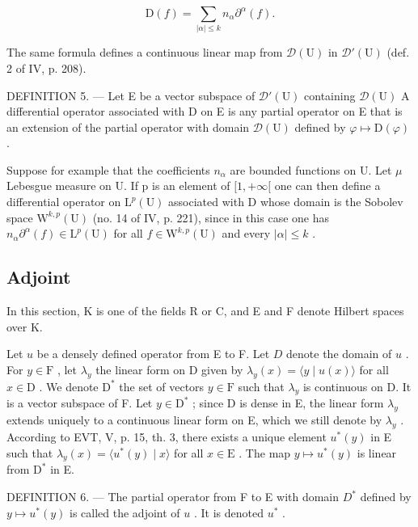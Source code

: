 \[
\mathrm{D} (f) = \sum_ {| \alpha | \leqslant k} n _ {\alpha} \partial^ {\alpha} (f).
\]

The same formula defines a continuous linear map from \(\mathcal{D}(\mathrm{U})\) in \(\mathcal{D}'(\mathrm{U})\) (def. 2 of IV, p. 208).

DEFINITION 5. --- Let E be a vector subspace of \(\mathcal{D}'(\mathrm{U})\) containing \(\mathcal{D}(\mathrm{U})\) A differential operator associated with D on E is any partial operator on E that is an extension of the partial operator with domain \(\mathcal{D}(\mathrm{U})\) defined by \(\varphi \mapsto \mathrm{D}(\varphi)\) .

Suppose for example that the coefficients \(n_{\alpha}\) are bounded functions on U. Let \(\mu\) Lebesgue measure on U. If p is an element of \([1,+\infty[\) one can then define a differential operator on \(\mathrm{L}^{p}(\mathrm{U})\) associated with D whose domain is the Sobolev space \(\mathrm{W}^{k,p}(\mathrm{U})\) (no. 14 of IV, p. 221), since in this case one has \(n_{\alpha}\partial^{\alpha}(f)\in\mathrm{L}^{p}(\mathrm{U})\) for all \(f\in\mathrm{W}^{k,p}(\mathrm{U})\) and every \(|\alpha|\leqslant k\) .

\subsection{Adjoint}

In this section, K is one of the fields R or C, and E and F denote Hilbert spaces over K.

Let \(u\) be a densely defined operator from E to F. Let \(D\) denote the domain of \(u\) . For \(y \in \mathrm{F}\) , let \(\lambda_y\) the linear form on D given by \(\lambda_y(x) = \langle y \mid u(x) \rangle\) for all \(x \in \mathrm{D}\) . We denote \(\mathrm{D}^*\) the set of vectors \(y \in \mathrm{F}\) such that \(\lambda_y\) is continuous on D. It is a vector subspace of F. Let \(y \in \mathrm{D}^*\) ; since D is dense in E, the linear form \(\lambda_y\) extends uniquely to a continuous linear form on E, which we still denote by \(\lambda_y\) . According to EVT, V, p. 15, th. 3, there exists a unique element \(u^*(y)\) in E such that \(\lambda_y(x) = \langle u^*(y) \mid x \rangle\) for all \(x \in \mathrm{E}\) . The map \(y \mapsto u^*(y)\) is linear from \(\mathrm{D}^*\) in E.

DEFINITION 6. --- The partial operator from F to E with domain \(D^*\) defined by \(y \mapsto u^*(y)\) is called the adjoint of \(u\) . It is denoted \(u^*\) .

